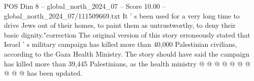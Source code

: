 \begin{textsample}{POS Dim 8 – global\_north\_2024\_07 – Score 10.00 – global\_north\_2024\_07/111509669.txt}
It ' s been used for a very long time to drive Jews out of their homes, to paint them as untrustworthy, to deny their basic dignity."correction The original version of this story erroneously stated that Israel ' s military campaign has killed more than 40,000 Palestinian civilians, according to the Gaza Health Ministry.
The story should have said the campaign has killed more than 39,445 Palestinians, as the health ministry @ @ @ @ @ @ @ @ @ @ has been updated.

\end{textsample}
